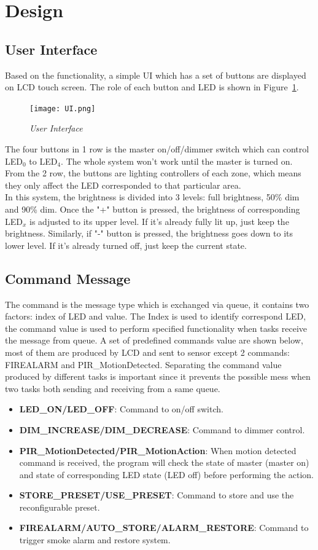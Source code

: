 \section{Design}
\subsection{User Interface}
Based on the functionality, a simple UI which has a set of buttons are displayed on LCD touch screen. The role of each button and LED is shown in Figure~\ref{fig:UI}.

\begin{figure}[H]
\centering
\texttt{[image: UI.png]}
\caption{\label{fig:UI}\textit{User Interface}}
\end{figure}
 
The four buttons in 1 row is the master on/off/dimmer switch which can control LED$_0$ to LED$_4$. The whole system won't work until the master is turned on. From the 2 row, the buttons are lighting controllers of each zone, which means they only affect the LED corresponded to that particular area.\\

In this system, the brightness is divided into 3 levels: full brightness, 50\% dim and 90\% dim. Once the "+" button is pressed, the brightness of corresponding LED$_x$ is adjusted to its upper level. If it's already fully lit up, just keep the brightness. Similarly, if "-" button is pressed, the brightness goes down to its lower level. If it's already turned off, just keep the current state.

\subsection{Command Message}
The command is the message type which is exchanged via queue, it contains two factors: index of LED and value. The Index is used to identify correspond LED, the command value is used to perform specified functionality when tasks receive the message from queue. A set of predefined commands value are shown below, most of them are produced by LCD and sent to sensor except 2 commands: FIREALARM and PIR\_MotionDetected. Separating the command value produced by different tasks is important since it prevents the possible mess when two tasks both sending and receiving from a same queue.
\begin{itemize}
\item \textbf{LED\_ON/LED\_OFF}: Command to on/off switch.
\item \textbf{DIM\_INCREASE/DIM\_DECREASE}: Command to dimmer control.
\item \textbf{PIR\_MotionDetected/PIR\_MotionAction}: When motion detected command is received, the program will check the state of master (master on) and state of corresponding LED state (LED off) before performing the action.
\item \textbf{STORE\_PRESET/USE\_PRESET}: Command to store and use the reconfigurable preset. 
\item \textbf{FIREALARM/AUTO\_STORE/ALARM\_RESTORE}: Command to trigger smoke alarm and restore system. 
\end{itemize}

